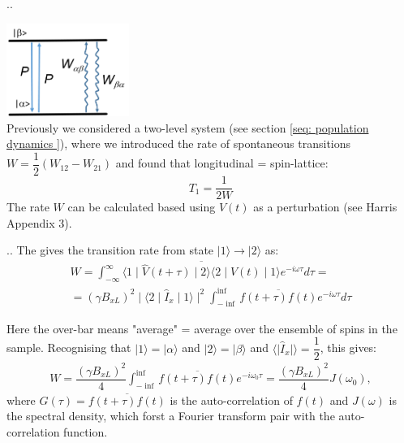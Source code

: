 \documentclass[handout]{beamer}
\begin{document}
\begin{frame}{\thesection.\thesubsection. \insertsubsection}

	\includegraphics[width=0.3\textwidth]{figures/two_level_population.png} \\
	 Previously we considered a two-level system  (see section \ref{seq: population dynamics }), where we introduced the rate of spontaneous transitions $W = \dfrac{1}{2}(W_{12} -W_{21})$ and found that \alert{longitudinal = spin-lattice}:
	 \begin{equation}
	   T_1 = \dfrac{1}{2 W}
	 \end{equation}
	 The rate $W$ can be calculated based using $V(t)$ as a perturbation (see Harris Appendix 3).
	
\end{frame}

\begin{frame}{\thesection.\thesubsection. \insertsubsection}	
	\onslide<1>
    The gives the transition rate from state $\mid 1 \rangle \rightarrow \mid 2 \rangle$ as:  
    \begin{multline}
       W = \int_{- \infty}^{\infty} \overline{ \langle 1 \mid \hat{V}(t+ \tau) \mid 2  \rangle \langle 2 \mid  \hat{V}(t)  \mid 1 \rangle  } e^{-i \omega \tau} d\tau = \\
       = (\gamma B_{xL})^2 \mid \langle 2 \mid \hat{I}_x \mid 1 \rangle \mid^2 \int_{ -\inf}^{\inf} \overline{ f(t+\tau) f(t) } e^{-i \omega \tau} d\tau
    \end{multline}
   
    Here the over-bar means "average" = average over the ensemble of spins in the sample.   Recognising that $ \vert 1 \rangle = \vert \alpha \rangle $ and $ \vert 2 \rangle = \vert \beta \rangle $ and $ \langle  \mid  \hat{I}_x \mid \rangle  = \dfrac{1}{2} $, this gives:
    \begin{multline}
       W = \dfrac{(\gamma B_{xL})^2}{4} \int_{- \inf}^{\inf} \overline{f(t+\tau) f(t)} e^{-i \omega_0 \tau} = \dfrac{(\gamma B_{xL})^2}{4} J(\omega_0),
    \end{multline}
    where $G(\tau) = \overline{f(t+ \tau) f(t)}$ is the \alert{auto-correlation} of $f(t)$ and $J(\omega)$ is the \alert{spectral density}, which forst a Fourier transform pair with the auto-correlation function.
\end{frame}
\end{document}
